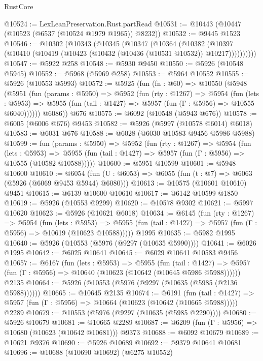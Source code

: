 \begin{lexlean}{RustCore}
\begin{coremodule}
@10524 := LexLeanPreservation.Rust.partRead
@10531 := @10443 (@10447 (@10523 (@6537 (@10524 @1979 @1965)) @8232))
@10532 := @9445 @1523
@10546 := @10302
    (@10343
      (@10345
        (@10347
          (@10364
            (@10382
              (@10397 (@10410 (@10419 (@10423 (@10432 (@10436 (@10531 @10532)) @10217))))))))))
@10547 := @5922 @258
@10548 := @5930 @9450
@10550 := @5926 (@10548 @5945)
@10552 := @5968 (@5969 @258)
@10553 := @5964 @10552
@10555 := @5926 (@10553 @5993)
@10572 := @5925
    (fun (fn : @60) =>
    @10550
      (@5948
        (@5951
          (fun (params : @5950) =>
          @5952
            (fun (rty : @1267) =>
            @5954
              (fun (lets : @5953) =>
              @5955 (fun (tail : @1427) => @5957 (fun (Γ : @5956) => @10555 @6040))))))
        @6086))
    @676
@10575 := @6092 (@10548 (@5943 @676))
@10578 := @6005 (@6006 @676) @9453
@10582 := @5926 (@5997 (@10578 @6014) @6018)
@10583 := @6031 @676
@10588 := @6028 (@6030 @10583 @9456 @5986 @5988)
@10599 := fun (params : @5950) =>
  @5952
    (fun (rty : @1267) =>
    @5954
      (fun (lets : @5953) =>
      @5955 (fun (tail : @1427) => @5957 (fun (Γ : @5956) => @10555 (@10582 @10588)))))
@10600 := @5951 @10599
@10601 := @5948 @10600
@10610 := @6054 (fun (U : @6053) => @6055 (fun (t : @7) => @6063 (@5926 (@6069 @9453 @5944) @6080)))
@10613 := @10575 (@10601 @10610) @9451
@10615 := @6139 @10600 @10610
@10617 := @6142 @10599 @1850
@10619 := @5926 (@10553 @9299)
@10620 := @10578 @9302
@10621 := @5997 @10620
@10623 := @5926 (@10621 @6018)
@10634 := @6145
    (fun (rty : @1267) =>
    @5954
      (fun (lets : @5953) =>
      @5955 (fun (tail : @1427) => @5957 (fun (Γ : @5956) => @10619 (@10623 @10588)))))
    @1995
@10635 := @5982 @1995
@10640 := @5926 (@10553 (@5976 (@9297 (@10635 @5990))))
@10641 := @6026 @1995
@10642 := @6025 @10641
@10645 := @6029 @10641 @10583 @9456
@10657 := @6167
    (fun (lets : @5953) =>
    @5955
      (fun (tail : @1427) =>
      @5957 (fun (Γ : @5956) => @10640 (@10623 (@10642 (@10645 @5986 @5988))))))
    @2135
@10664 := @5926 (@10553 (@5976 (@9297 (@10635 (@5985 (@2136 @5988))))))
@10665 := @10645 @2135
@10674 := @6191
    (fun (tail : @1427) => @5957 (fun (Γ : @5956) => @10664 (@10623 (@10642 (@10665 @5988)))))
    @2289
@10679 := @10553 (@5976 (@9297 (@10635 (@5985 @2290))))
@10680 := @5926 @10679
@10681 := @10665 @2289
@10687 := @6209 (fun (Γ : @5956) => @10680 (@10623 (@10642 @10681))) @9373
@10688 := @6092 @10679
@10689 := @10621 @9376
@10690 := @5926 @10689
@10692 := @9379 @10641 @10681
@10696 := @10688 (@10690 @10692) (@6275 @10552)

\end{coremodule}
\end{lexlean}
